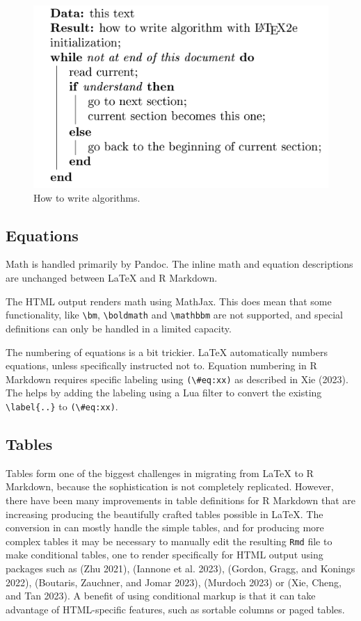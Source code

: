 \begin{figure}

{\centering \includegraphics[width=0.6\linewidth]{alghow} 

}

\caption{How to write algorithms.}\label{fig:alghow}
\end{figure}

\hypertarget{equations}{%
\subsection{Equations}\label{equations}}

Math is handled primarily by Pandoc. The inline math and equation descriptions are unchanged between LaTeX and R Markdown.

The HTML output renders math using MathJax. This does mean that some functionality, like \texttt{\textbackslash{}bm}, \texttt{\textbackslash{}boldmath} and \texttt{\textbackslash{}mathbbm} are not supported, and special definitions can only be handled in a limited capacity.

The numbering of equations is a bit trickier. LaTeX automatically numbers equations, unless specifically instructed not to. Equation numbering in R Markdown requires specific labeling using \texttt{(\textbackslash{}\#eq:xx)} as described in Xie (2023). The  helps by adding the labeling using a Lua filter to convert the existing \texttt{\textbackslash{}label\{..\}} to \texttt{(\textbackslash{}\#eq:xx)}.

\hypertarget{tables}{%
\subsection{Tables}\label{tables}}

Tables form one of the biggest challenges in migrating from LaTeX to R Markdown, because the sophistication is not completely replicated. However, there have been many improvements in table definitions for R Markdown that are increasing producing the beautifully crafted tables possible in LaTeX. The conversion in  can mostly handle the simple tables, and for producing more complex tables it may be necessary to manually edit the resulting \texttt{Rmd} file to make conditional tables, one to render specifically for HTML output using packages such as  (Zhu 2021),  (Iannone et al. 2023),  (Gordon, Gragg, and Konings 2022),  (Boutaris, Zauchner, and Jomar 2023),  (Murdoch 2023) or  (Xie, Cheng, and Tan 2023). A benefit of using conditional markup is that it can take advantage of HTML-specific features, such as sortable columns or paged tables.

